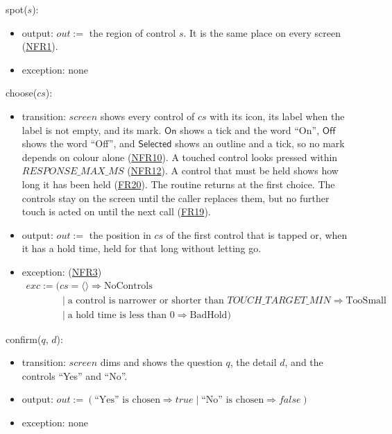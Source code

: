 \documentclass[10pt, titlepage]{article}
\newcommand{\srsurl}{https://team-hindsight.github.io/ophthamology-game/SRS/SRS.pdf}
\newcommand{\srsitemref}[2]{\href{\srsurl\#nameddest=#1}{#2}}
\newcommand{\T}[1]{\mathit{#1}}          %
\newcommand{\V}[1]{\mathsf{#1}}          %
\newcommand{\out}{\mathit{out}}
\newcommand{\exc}{\mathit{exc}}
\newcommand{\true}{\mathit{true}}
\newcommand{\false}{\mathit{false}}
\begin{document}
\begin{samepage}
\noindent spot($s$):
\begin{itemize}
\item output: $\out :=$ the region of control $s$. It is the same place on
  every screen (\srsitemref{NFR_Layout}{NFR1}).
\item exception: none
\end{itemize}
\end{samepage}
\par\pagebreak[0]

\begin{samepage}
\noindent choose($\T{cs}$):
\begin{itemize}
\item transition: $\T{screen}$ shows every control of $\T{cs}$ with its icon,
  its label when the label is not empty, and its mark. $\V{On}$ shows a tick
  and the word ``On'', $\V{Off}$ shows the word ``Off'', and $\V{Selected}$
  shows an outline and a tick, so no mark depends on colour alone
  (\srsitemref{NFR_Colour}{NFR10}). A touched control looks pressed within
  $\T{RESPONSE\_MAX\_MS}$ (\srsitemref{NFR_Responsiveness}{NFR12}). A control
  that must be held shows how long it has been held
  (\srsitemref{FR_HoldSkip}{FR20}). The routine returns at the first choice.
  The controls stay on the screen until the caller replaces them, but no
  further touch is acted on until the next call
  (\srsitemref{FR_IgnoreRepeatedTouches}{FR19}).
\item output: $\out :=$ the position in $\T{cs}$ of the first control that is
  tapped or, when it has a hold time, held for that long without letting go.
\item exception: (\srsitemref{NFR_TouchTarget}{NFR3})
  \[\begin{array}{l}
  \exc := (\T{cs} = \langle\rangle \Rightarrow \text{NoControls}\\
  \phantom{\exc := (}\mid \text{a control is narrower or shorter than }
  \T{TOUCH\_TARGET\_MIN} \Rightarrow \text{TooSmall}\\
  \phantom{\exc := (}\mid \text{a hold time is less than 0} \Rightarrow
  \text{BadHold})
  \end{array}\]
\end{itemize}
\end{samepage}
\par\pagebreak[0]

\begin{samepage}
\noindent confirm($q$, $d$):
\begin{itemize}
\item transition: $\T{screen}$ dims and shows the question $q$, the detail
  $d$, and the controls ``Yes'' and ``No''.
\item output: $\out := (\text{``Yes'' is chosen} \Rightarrow \true \mid
  \text{``No'' is chosen} \Rightarrow \false)$
\item exception: none
\end{itemize}
\end{samepage}
\par\pagebreak[0]
\end{document}
